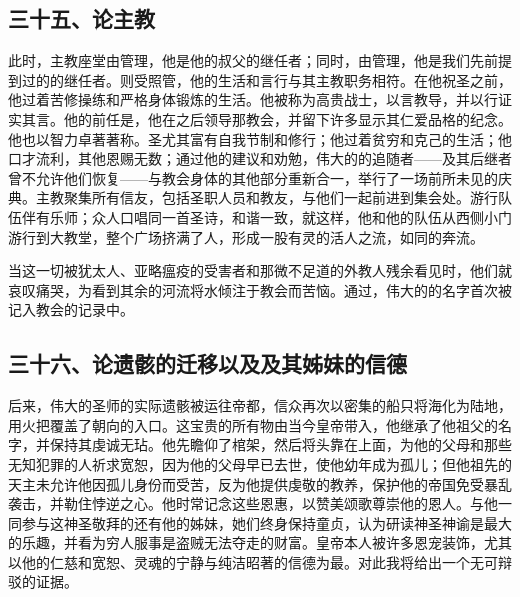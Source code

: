 
\subsection{三十五、论主教}

此时，主教座堂由管理，他是他的叔父的继任者；同时，由管理，他是我们先前提到过的的继任者。则受照管，他的生活和言行与其主教职务相符。在他祝圣之前，他过着苦修操练和严格身体锻炼的生活。他被称为高贵战士，以言教导，并以行证实其言。他的前任是，他在之后领导那教会，并留下许多显示其仁爱品格的纪念。他也以智力卓著著称。圣尤其富有自我节制和修行；他过着贫穷和克己的生活；他口才流利，其他恩赐无数；通过他的建议和劝勉，伟大的的追随者——及其后继者曾不允许他们恢复——与教会身体的其他部分重新合一，举行了一场前所未见的庆典。主教聚集所有信友，包括圣职人员和教友，与他们一起前进到集会处。游行队伍伴有乐师；众人口唱同一首圣诗，和谐一致，就这样，他和他的队伍从西侧小门游行到大教堂，整个广场挤满了人，形成一股有灵的活人之流，如同的奔流。\par

当这一切被犹太人、亚略瘟疫的受害者和那微不足道的外教人残余看见时，他们就哀叹痛哭，为看到其余的河流将水倾注于教会而苦恼。通过，伟大的的名字首次被记入教会的记录中。\par


\subsection{三十六、论遗骸的迁移以及及其姊妹的信德}

后来，伟大的圣师的实际遗骸被运往帝都，信众再次以密集的船只将海化为陆地，用火把覆盖了朝向的入口。这宝贵的所有物由当今皇帝带入，他继承了他祖父的名字，并保持其虔诚无玷。他先瞻仰了棺架，然后将头靠在上面，为他的父母和那些无知犯罪的人祈求宽恕，因为他的父母早已去世，使他幼年成为孤儿；但他祖先的天主未允许他因孤儿身份而受苦，反为他提供虔敬的教养，保护他的帝国免受暴乱袭击，并勒住悖逆之心。他时常记念这些恩惠，以赞美颂歌尊崇他的恩人。与他一同参与这神圣敬拜的还有他的姊妹，她们终身保持童贞，认为研读神圣神谕是最大的乐趣，并看为穷人服事是盗贼无法夺走的财富。皇帝本人被许多恩宠装饰，尤其以他的仁慈和宽恕、灵魂的宁静与纯洁昭著的信德为最。对此我将给出一个无可辩驳的证据。\par

